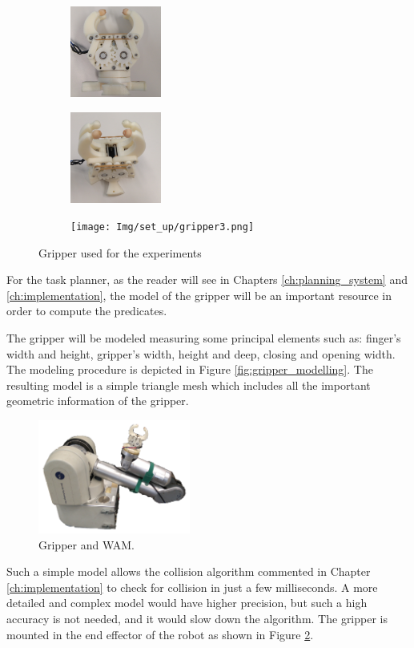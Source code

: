 \begin{figure}[tb]
\centering
\begin{subfigure}[b]{0.3\textwidth}
\centering
\includegraphics[height=3cm]{Img/set_up/gripper1.png}
\end{subfigure}
\begin{subfigure}[b]{0.3\textwidth}
\centering
\includegraphics[height=3cm]{Img/set_up/gripper2.png}
\end{subfigure}
\begin{subfigure}[b]{0.3\textwidth}
\centering
\texttt{[image: Img/set\_up/gripper3.png]}
\end{subfigure}
\caption{Gripper used for the experiments}\label{fig:gripper_general}
\end{figure}

For the task planner, as the reader will see in Chapters \ref{ch:planning_system} and \ref{ch:implementation}, the model of the gripper will be an important resource 
in order to compute the predicates. 

The gripper will be modeled measuring some principal elements such as: finger's width and height, gripper's width, height and deep, closing and opening width. The modeling procedure is depicted in Figure \ref{fig:gripper_modelling}. The resulting model is a simple triangle mesh which includes all the important geometric information of the gripper.
\begin{figure}[tb]
\centering
\includegraphics[width=5.0cm]{Img/set_up/wam_gripper2.png}
\caption{Gripper and WAM.}\label{fig:wam_gripper}
\end{figure}
Such a simple model allows the collision algorithm commented in Chapter \ref{ch:implementation} to check for collision in just a few milliseconds. 
A more detailed and complex model would have higher precision, but such a high accuracy is not needed, and it would slow down the algorithm. 
The gripper is mounted in the end effector of the robot as shown in Figure \ref{fig:wam_gripper}. 



